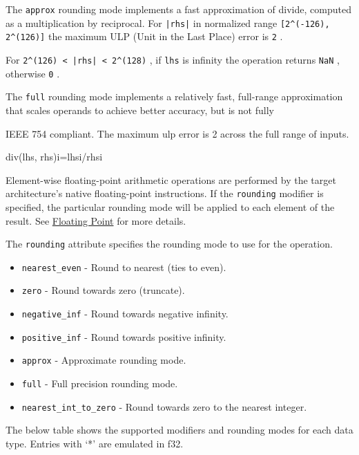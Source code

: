 \documentclass{article}
\begin{document}
The \texttt{approx} rounding mode implements a fast approximation of divide, computed as a multiplication by reciprocal. For \texttt{|rhs|} in normalized range \texttt{[2\textasciicircum{}(-126), 2\textasciicircum{}(126)]} the maximum ULP (Unit in the Last Place) error is \texttt{2} .

For \texttt{2\textasciicircum{}(126) < |rhs| < 2\textasciicircum{}(128)} , if \texttt{lhs} is infinity the operation returns \texttt{NaN} , otherwise \texttt{0} .


The \texttt{full} rounding mode implements a relatively fast, full-range approximation that scales operands to achieve better accuracy, but is not fully

IEEE 754 compliant. The maximum ulp error is 2 across the full range of inputs.


div(lhs, rhs)i=lhsi/rhsi

Element-wise floating-point arithmetic operations are performed by the target architecture's native floating-point instructions. If the \texttt{rounding} modifier is specified, the particular rounding mode will be applied to each element of the result. See \href{https://docs.nvidia.com/cuda/tile-ir/latest/sections/operations.html#op-group-floating-point}{Floating Point} for more details.


The \texttt{rounding} attribute specifies the rounding mode to use for the operation.


\begin{itemize}
\item \texttt{nearest\_even} - Round to nearest (ties to even).
\item \texttt{zero} - Round towards zero (truncate).
\item \texttt{negative\_inf} - Round towards negative infinity.
\item \texttt{positive\_inf} - Round towards positive infinity.
\item \texttt{approx} - Approximate rounding mode.
\item \texttt{full} - Full precision rounding mode.
\item \texttt{nearest\_int\_to\_zero} - Round towards zero to the nearest integer.

\end{itemize}
The below table shows the supported modifiers and rounding modes for each data type. Entries with `*' are emulated in f32.
\end{document}
